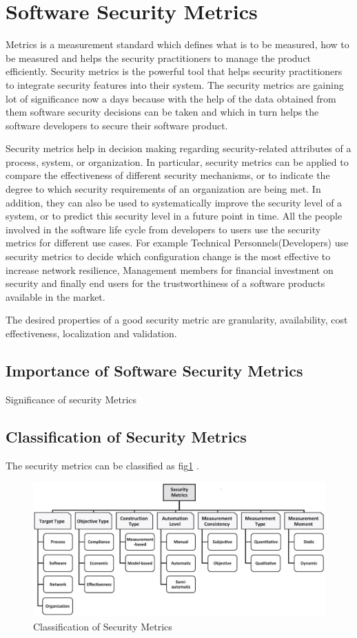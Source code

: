 \documentclass[pdftex,english,oribibl]{llncs}
\begin{document}
\section{Software Security Metrics}
Metrics is a measurement standard which defines what is to be measured, how to be measured and helps the security practitioners to manage the product efficiently. Security metrics is the powerful tool that helps security practitioners to integrate security features into their system. The security metrics are gaining lot of significance now a days because with the help of the data obtained from them software security decisions can be taken and which in turn helps the software developers to secure their software product. 

Security metrics help in decision making regarding security-related attributes of a process, system, or organization. In particular, security metrics can be applied to compare the effectiveness of different security mechanisms, or to indicate the degree to which security requirements of an organization are being met. In addition, they can also be used to systematically improve the security level of a system, or to predict this security level in a future point in time. All the people involved in the software life cycle from developers to users use the security metrics for different use cases. For example Technical Personnels(Developers) use security metrics to decide which configuration change is the most effective to increase network resilience, Management members for financial investment on security and finally end users for the trustworthiness of a software products available in the market.

The desired properties of a good security metric are granularity, availability, cost effectiveness, localization and validation\cite{8017389}. 

\subsection{Importance of Software Security Metrics}
Significance of security Metrics
\subsection{Classification of Security Metrics}
The security metrics can be classified as fig\ref{fig:security_metric_types} \cite{8017389}.

\begin{figure}
	\includegraphics[width=\linewidth]{figures/security_metric_types.jpg}
	\caption{Classification of Security Metrics}
	\label{fig:security_metric_types}
\end{figure}
\end{document}
